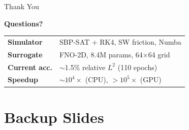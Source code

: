 \documentclass[aspectratio=169,12pt]{beamer}
\begin{document}
\begin{frame}{Thank You}
  \begin{center}
    {\Large \textbf{Questions?}}\\[16pt]


    \vspace{12pt}
    \begin{tabular}{ll}
      \toprule
      \textbf{Simulator}   & SBP-SAT $+$ RK4, SW friction, Numba \\
      \textbf{Surrogate}   & FNO-2D, 8.4M params, 64$\times$64 grid \\
      \textbf{Current acc.}& $\sim$1.5\% relative $L^2$ (110 epochs) \\
      \textbf{Speedup}     & $\sim$$10^4\times$ (CPU), $>$$10^5\times$ (GPU) \\
      \bottomrule
    \end{tabular}
  \end{center}
\end{frame}

\appendix
\section*{Backup Slides}
\end{document}

